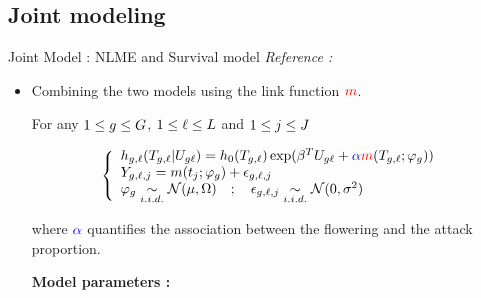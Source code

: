 \documentclass[10pt,xcolor={dvipsnames}]{beamer}
\begin{document}
\subsection{Joint modeling}
\begin{frame}{Joint Model : NLME and Survival model}
    \textit{Reference :} \cite{rizopoulos_joint_2012}
    \begin{itemize}
        \item Combining the two models using the link function $\tcr \nonlinearfct$. %
        
        
    For any $\foranygeno$, $\foranylines$ and $\foranyobs$
    
    \begin{equation}\label{jointmodel}
        \stackeq[lll]{ 
            \hazard_\genolines (T_\genolines| U_\meltgenolines) 
                = \hazard_0(T_\genolines) \exp(\beta ^T U_\meltgenolines + \tcb \alpha \tcr \nonlinearfct(T_\genolines;\vphi_\geno) )
        \\  Y_\genolinesobs = \nonlinearfct(t_\obs ; \vphi_\geno )  + \epsilon_\genolinesobs 
        \\  \vphi_\geno \under\sim{i.i.d.} \mc N(\mu, \Omega) \quad  ;  \quad  \epsilon_\genolinesobs \under\sim{i.i.d.} \mc N(0,\sigma^2) }
    \end{equation}
        
        where $\tcb \alpha$ quantifies the association between the flowering and the attack proportion.
        
        \begin{center}
            \bf{Model parameters :} 
        \end{center}
    \end{itemize}
\end{frame}

\end{document}
